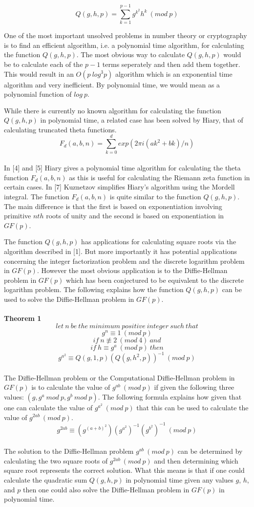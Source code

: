\documentclass[final,letterpaper,oneside,10pt]{article}
\begin{document}
\[Q(g,h,p) = \sum_{k=1}^{p-1} g^{k^2}h^k~(mod~ p)\]

One of the most important unsolved problems in number theory or cryptography is to find an efficient algorithm, i.e. a polynomial time
algorithm, for calculating the function $Q(g,h,p)$.  The most obvious way to calculate $Q(g,h,p)$ would be to calculate each of the $p-1$
terms seperately and then add them together.  This would result in an $O(p~log^3p)$ algorithm which is an exponential time algorithm and 
very inefficient.  By polynomial time, we would mean as a polynomial function of $log~p$.

While there is currently no known algorithm for calculating the function $Q(g,h,p)$ in polynomial time, a related case has been solved by Hiary, 
that of calculating truncated theta functions.
\\
\[F_d(a,b,n) = \sum_{k=0}^d exp(2 \pi i (ak^2+bk)/n)\]
\\
In [4] and [5] Hiary gives a polynomial time algorithm for calculating the theta function $F_d(a,b,n)$ as this is useful for calculating the 
Riemann zeta function in certain cases.  In [7] Kuznetzov simplifies Hiary's algorithm using the Mordell integral.  The function $F_d(a,b,n)$ is
quite similar to the function $Q(g,h,p)$.  The main difference is that the first is based on exponentiation involving primitive $nth$ roots of unity
and the second is based on exponentiation in $GF(p)$. 

The function $Q(g,h,p)$ has applications for calculating square roots via the algorithm described in [1].  But more importantly it 
has potential applications concerning the integer factorization problem and the discrete logarithm problem in $GF(p)$.  However the most obvious
application is to the Diffie-Hellman problem in $GF(p)$ which has been conjectured to be equivalent to the discrete logarithm problem.  The 
following explains how the function $Q(g,h,p)$ can be used to solve the Diffie-Hellman problem in $GF(p)$.
\\
\\
\textbf{Theorem 1}
\
\[let~n~be~ the ~minimum ~positive~ integer~ such~ that\]
\[g^n\equiv1~(mod~p)\]
\[if~n\not\equiv 2~(mod~4)~and\]
\[if~h\equiv g^a~(mod~p)~then\]
\[g^{a^2} \equiv Q(g,1,p)(Q(g,h^2,p))^{-1}~(mod~p)\]
\\
The Diffie-Hellman problem or the Computational Diffie-Hellman problem in $GF(p)$ is to calculate the value of $g^{ab}~(mod~p)$ if given
the following three values: $(g,g^a~mod~p,g^b~mod~p)$.  The following formula explains how given that one can calculate  the value of
$g^{a^2}~(mod~p)$ that this can be used to calculate the value of $g^{2ab}~(mod~p)$.
\
\
\[g^{2ab} \equiv (g^{(a+b)^2})(g^{a^2})^{-1}(g^{b^2})^{-1}~(mod~p)\]
\\
The solution to the Diffie-Hellman problem $g^{ab}~(mod~p)$ can be determined by calculating the two square roots of $g^{2ab}~(mod~p)$ 
and then determining which square root represents the correct solution.  What this means is that if one could calculate the quadratic sum $Q(g,h,p)$ 
in polynomial time given any values $g$, $h$, and $p$ then one could also solve the Diffie-Hellman problem in $GF(p)$ in polynomial time.
\\
\end{document}
